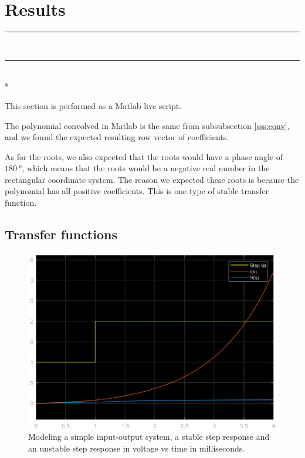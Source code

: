 \documentclass[12pt]{article}
\def\hr{{\par\noindent\rule{\textwidth}{0.4pt}}}
\begin{document}
\section{Results}

\hr

%

\ \hr \\*

This section is performed as a Matlab live script.

The polynomial convolved in Matlab is the same from subsubsection \ref{sss:conv}, and we found the expected resulting row vector of coefficients.

As for the roots, we also expected that the roots would have a phase angle of $\SI{180}\degree$,
which means that the roots would be a negative real number in the rectangular coordinate system.
The reason we expected these roots is because the polynomial has all positive coefficients.
This is one type of stable transfer function.

\subsection{Transfer functions}

\begin{figure}
    \centering
    \includegraphics[width=\linewidth]{transfer_functions.eps}
    \caption{Modeling a simple input-output system, a stable step response and an unstable step response in voltage vs time in milliseconds.}
    \label{fig:transfer functions}
\end{figure}
\end{document}

